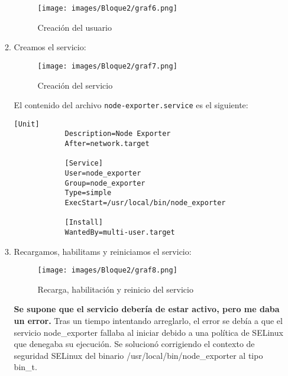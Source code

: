 \begin{enumerate}
\begin{enumerate}
        \begin{figure}[H]
            \centering
            \texttt{[image: images/Bloque2/graf6.png]}
            \caption{Creación del usuario}
            \label{fig:usuario}
        \end{figure}
        \item Creamos el servicio:
        \begin{figure}[H]
            \centering
            \texttt{[image: images/Bloque2/graf7.png]}
            \caption{Creación del servicio}
            \label{fig:servicio}
        \end{figure}
        El contenido del archivo \texttt{node-exporter.service} es el siguiente:
        \begin{lstlisting}[style=customstyle]
            [Unit]
            Description=Node Exporter
            After=network.target

            [Service]
            User=node_exporter
            Group=node_exporter
            Type=simple
            ExecStart=/usr/local/bin/node_exporter

            [Install]
            WantedBy=multi-user.target
        \end{lstlisting}
        \item Recargamos, habilitams y reiniciamos el servicio:
        \begin{figure}[H]
            \centering
            \texttt{[image: images/Bloque2/graf8.png]}
            \caption{Recarga, habilitación y reinicio del servicio}
            \label{fig:recarga}
        \end{figure}

        \textbf{Se supone que el servicio debería de estar activo, pero me daba un error.} Tras un tiempo intentando arreglarlo, el error se debía a que el servicio node\_exporter fallaba al iniciar debido a una política de SELinux que denegaba su ejecución. Se solucionó corrigiendo el contexto de seguridad SELinux del binario /usr/local/bin/node\_exporter al tipo bin\_t.


\end{enumerate}
\end{enumerate}
